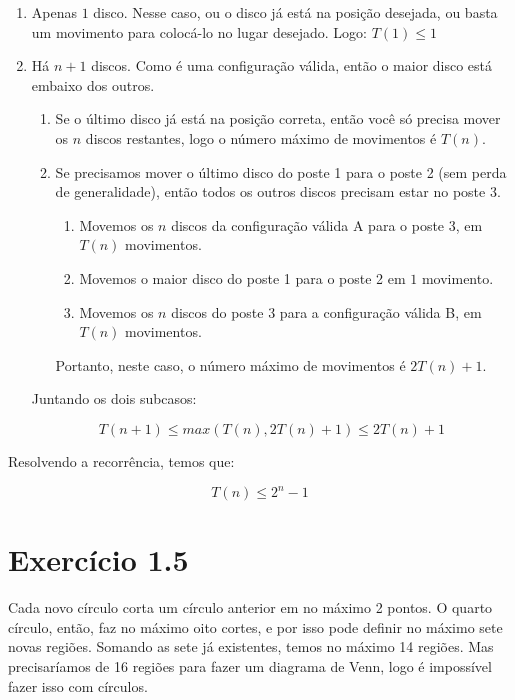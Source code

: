 \documentclass[10pt]{book}
\begin{document}
\begin{enumerate}

\item Apenas $1$ disco. 
Nesse caso, ou o disco já está na posição desejada, ou basta um movimento para colocá-lo no lugar desejado. Logo: $T(1)\leq 1$

\item Há $n+1$ discos. 
 Como é uma configuração válida, então o maior disco está embaixo dos outros. 

  \begin{enumerate}

   \item Se o último disco já está na posição correta, então você só precisa mover os $n$ discos restantes, logo o número máximo de movimentos é $T(n)$. 
   \item Se precisamos mover o último disco do poste 1 para o poste 2 (sem perda de generalidade), então todos os outros discos precisam estar no poste 3. 
     \begin{enumerate}
       \item Movemos os $n$ discos da configuração válida A para o poste 3, em $T(n)$ movimentos. 
       \item Movemos o maior disco do poste 1 para o poste 2 em $1$ movimento. 
       \item Movemos os $n$ discos do poste 3 para a configuração válida B, em $T(n)$ movimentos. 
     \end{enumerate}
  Portanto, neste caso, o número máximo de movimentos é $2T(n)+1$. 
  \end{enumerate}

Juntando os dois subcasos: 

\[T(n+1)\leq max(T(n),  2T(n)+1)\leq 2T(n)+1 \]
\end{enumerate}

Resolvendo a recorrência, temos que: 

 \[T(n)\leq 2^n-1 \]

\section{Exercício 1.5}

Cada novo círculo corta um círculo anterior em no máximo 2 pontos. O quarto círculo, então, faz no máximo oito cortes, e por isso pode definir no máximo sete novas regiões. Somando as sete já existentes, temos no máximo 14 regiões. Mas precisaríamos de 16 regiões para fazer um diagrama de Venn, logo é impossível fazer isso com círculos. 
\end{document}
